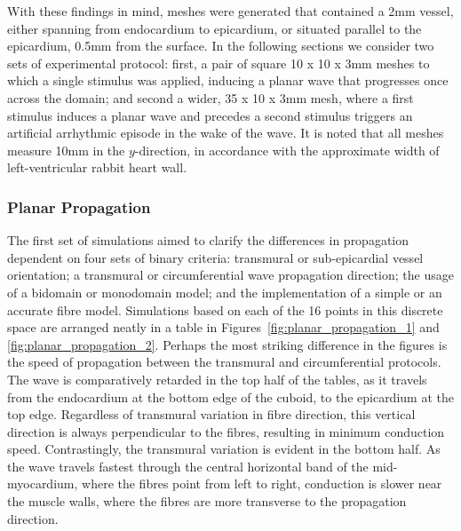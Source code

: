   With these findings in mind, meshes were generated that contained a 2mm vessel, either spanning from endocardium to epicardium, or situated parallel to the epicardium, 0.5mm from the surface. In the following sections we consider two sets of experimental protocol: first, a pair of square 10 x 10 x 3mm meshes to which a single stimulus was applied, inducing a planar wave that progresses once across the domain; and second a wider, 35 x 10 x 3mm mesh, where a first stimulus induces a planar wave and precedes a second stimulus triggers an artificial arrhythmic episode in the wake of the wave. It is noted that all meshes measure 10mm in the $y$-direction, in accordance with the approximate width of left-ventricular rabbit heart wall.
    
  \subsubsection{Planar Propagation} %
  \label{sub:planar_propagation}
    The first set of simulations aimed to clarify the differences in propagation dependent on four sets of binary criteria: transmural or sub-epicardial vessel orientation; a transmural or circumferential wave propagation direction; the usage of a bidomain or monodomain model; and the implementation of a simple or an accurate fibre model. Simulations based on each of the 16 points in this discrete space are arranged neatly in a table in Figures~\ref{fig:planar_propagation_1} and \ref{fig:planar_propagation_2}. Perhaps the most striking difference in the figures is the speed of propagation between the transmural and circumferential protocols. The wave is comparatively retarded in the top half of the tables, as it travels from the endocardium at the bottom edge of the cuboid, to the epicardium at the top edge. Regardless of transmural variation in fibre direction, this vertical direction is always perpendicular to the fibres, resulting in minimum conduction speed. Contrastingly, the transmural variation is evident in the bottom half. As the wave travels fastest through the central horizontal band of the mid-myocardium, where the fibres point from left to right, conduction is slower near the muscle walls, where the fibres are more transverse to the propagation direction.
    
